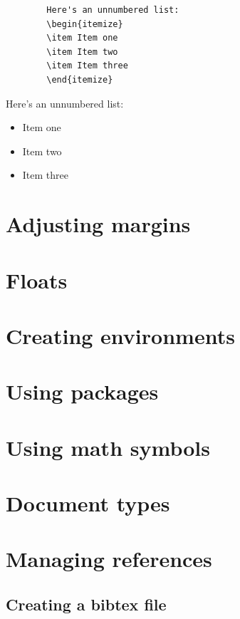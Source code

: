 \documentclass[12pts]{article}
\begin{document}
	\begin{multicols}{2}
		\begin{Verbatim}
		Here's an unnumbered list:
		\begin{itemize}
		\item Item one
		\item Item two
		\item Item three
		\end{itemize}
		\end{Verbatim}
		
		\columnbreak	
		
		Here's an unnumbered list:
		\begin{itemize}
			\item Item one
			\item Item two
			\item Item three
		\end{itemize}
	\end{multicols}
	
	\section{Adjusting margins}
	\section{Floats}
	\section{Creating environments}
	\section{Using packages}
	\section{Using math symbols}
	\section{Document types}
	\section{Managing references}
	
	\subsection{Creating a bibtex file}
	
\end{document}
